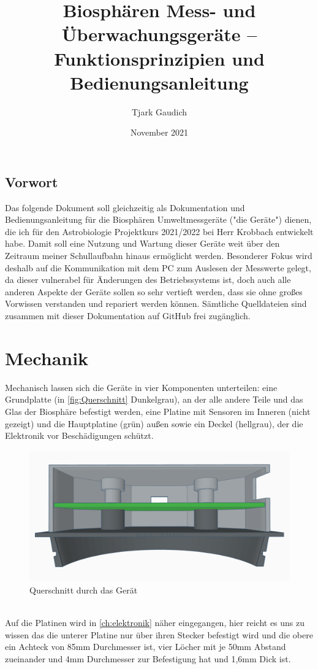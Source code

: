 \documentclass[12pt, a4paper, oneside]{report}
\title{\textbf{Biosphären Mess- und Überwachungsgeräte -- Funktionsprinzipien und Bedienungsanleitung}}
\author{Tjark Gaudich}
\date{November 2021}
\begin{document}

\begin{titlepage}
\maketitle
\thispagestyle{empty}
\end{titlepage}

\section{Vorwort}
Das folgende Dokument soll gleichzeitig als Dokumentation und Bedienungsanleitung für die Biosphären Umweltmessgeräte ("die Geräte") dienen, die ich für den Astrobiologie Projektkurs 2021/2022 bei Herr Krobbach entwickelt habe. Damit soll eine Nutzung und Wartung dieser Geräte weit über den Zeitraum meiner Schullaufbahn hinaus ermöglicht werden. Besonderer Fokus wird deshalb auf die Kommunikation mit dem PC zum Auslesen der Messwerte gelegt, da dieser vulnerabel für Änderungen des Betriebssystems ist, doch auch alle anderen Aspekte der Geräte sollen so sehr vertieft werden, dass sie ohne großes Vorwissen verstanden und repariert werden können. Sämtliche Quelldateien sind zusammen mit dieser Dokumentation auf 
GitHub\cite{Github} frei zugänglich.
\tableofcontents
\listoffigures

\chapter{Mechanik}

Mechanisch lassen sich die Geräte in vier Komponenten unterteilen:
eine Grundplatte (in \autoref{fig:Querschnitt} Dunkelgrau), an der alle andere Teile und das Glas der Biosphäre befestigt werden, eine Platine mit Sensoren im Inneren (nicht gezeigt) und die Hauptplatine (grün) außen sowie ein Deckel (hellgrau), der die Elektronik vor Beschädigungen schützt.
\begin{figure}[h]
	\centering
	\includegraphics[width=1\textwidth]{pic/Querschnitt}
	\caption{Querschnitt durch das Gerät}
	\label{fig:Querschnitt}
\end{figure}
\\Auf die Platinen wird in \autoref{ch:elektronik} näher eingegangen, hier reicht es uns zu wissen das die unterer Platine nur über ihren Stecker befestigt wird und die obere ein Achteck von 85mm Durchmesser ist, vier Löcher mit je 50mm Abstand zueinander und 4mm Durchmesser zur Befestigung hat und 1,6mm Dick ist.
\end{document}
